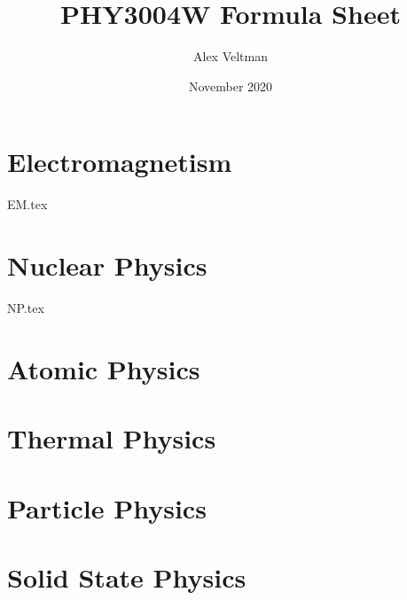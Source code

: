 \documentclass[a4paper]{article}
\title{PHY3004W Formula Sheet}
\author{Alex Veltman}
\date{November 2020}
\makeatletter
\numberwithin{equation}{section}
\renewcommand{\maketitle} %
{ \begingroup \vskip 10pt \begin{center} \large {\bf \@title}
	\vskip 10pt \large \@author \hskip 20pt \@date \end{center}
  \vskip 10pt \endgroup \setcounter{footnote}{0} }
\makeatother
\begin{document}
\maketitle

\begin{multicols*}{2}

\section{Electromagnetism}
{EM.tex}

\section{Nuclear Physics}
{NP.tex}

\section{Atomic Physics}

\section{Thermal Physics}

\section{Particle Physics}

\section{Solid State Physics}

\end{multicols*}
\end{document}
